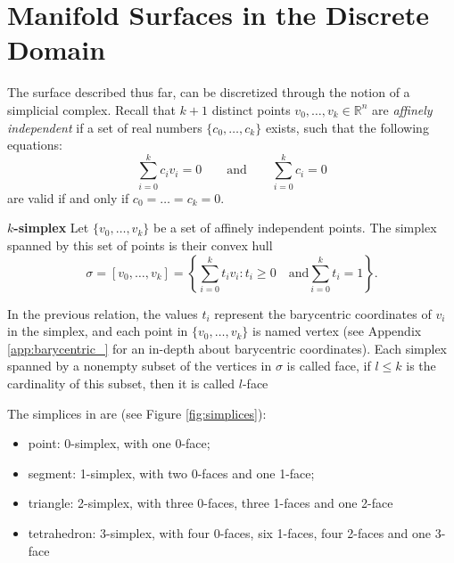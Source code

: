 
\section{Manifold Surfaces in the Discrete Domain}
\label{sec:manif_discr}
The surface described thus far, can be discretized through the notion of a simplicial complex.
Recall that $k + 1$ distinct points $v_0, \dots, v_k \in \mathbb{R}^n$ are \emph{affinely independent} if a set of real numbers $\{c_0, \dots, c_k \}$ exists, such that the following equations:
\[
\sum_{i=0}^k{c_i v_i} = 0 \qquad \text{and} \qquad \sum_{i=0}^k{c_i} = 0
\]
are valid if and only if   $c_0 = \dots = c_k = 0$. 


\begin{mydef}
 \textbf{$k$-simplex}  
 Let $\{v_0, \dots, v_k\}$ be a set of affinely independent points. The simplex spanned by this set of points is their convex hull
 \[
 \sigma = [v_0, \dots, v_k] = \left\{ \sum_{i=0}^{k}{t_i v_i} : t_i \geq 0 \quad \text{and}  \sum_{i=0}^{k}{t_i} = 1\right\}.
 \]
\end{mydef}
In the previous relation, the values $t_i$ represent the barycentric coordinates of $v_i$ in the simplex, and each point in $\{v_0, \dots, v_k\}$ is named vertex (see Appendix \ref{app:barycentric_} for an in-depth about barycentric coordinates).
Each simplex spanned by a nonempty subset of the vertices in $\sigma$ is called face, if $l\leq k$ is the cardinality of this subset, then it is called $l$-face

The simplices in \Rthree are (see Figure \ref{fig:simplices}):
\begin{itemize}
  \item point: 0-simplex, with one 0-face;
  \item segment: 1-simplex, with two 0-faces and one 1-face;
  \item triangle: 2-simplex, with three 0-faces, three 1-faces and one 2-face
  \item tetrahedron: 3-simplex, with four 0-faces, six 1-faces, four 2-faces and one 3-face
\end{itemize}

